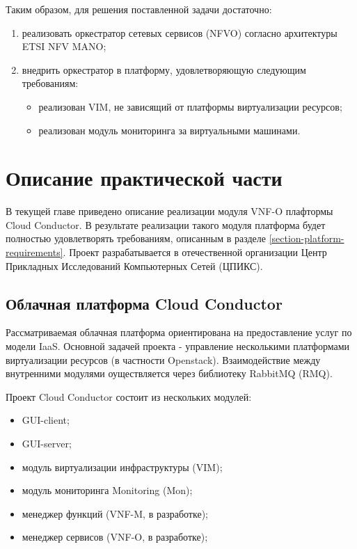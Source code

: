 \documentclass[oneside,final,14pt,a4paper]{extreport}
\begin{document}
Таким образом, для решения поставленной задачи достаточно:
\begin{enumerate}
	\item реализовать оркестратор сетевых сервисов (NFVO) согласно архитектуры ETSI NFV MANO;
	\item внедрить оркестратор в платформу, удовлетворяющую следующим требованиям:
	\begin{itemize}
		\item реализован VIM, не зависящий от платформы виртуализации ресурсов;
		\item реализован модуль мониторинга за виртуальными машинами.
	\end{itemize}
\end{enumerate}





\chapter{Описание практической части}
\label{chap:practice}
В текущей главе приведено описание реализации модуля VNF-O плафтормы Cloud Conductor. В результате реализации такого модуля платформа будет полностью удовлетворять требованиям, описанным в разделе \ref{section-platform-requirements}. Проект разрабатывается в отечественной организации Центр Прикладных Исследований Компьютерных Сетей (ЦПИКС).

\section{Облачная платформа Cloud Conductor}
Рассматриваемая облачная платформа ориентирована на предоставление услуг по модели IaaS. Основной задачей проекта - управление несколькими платформами виртуализации ресурсов (в частности Openstack). Взаимодействие между внутренними модулями оуществляется через библиотеку RabbitMQ (RMQ).

Проект Cloud Conductor состоит из нескольких модулей:
\begin{itemize}
	\item GUI-client;
	\item GUI-server;
	\item модуль виртуализации инфраструктуры (VIM);
	\item модуль мониторинга Monitoring (Mon);
	\item менеджер функций (VNF-M, в разработке);
	\item менеджер сервисов (VNF-O, в разработке);
\end{itemize}
\end{document}
